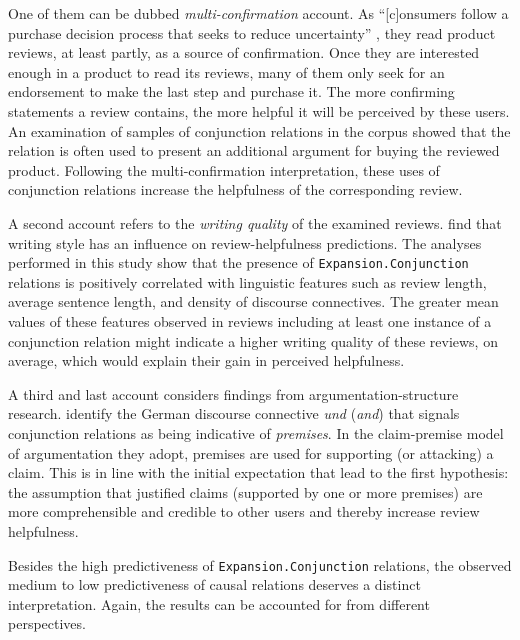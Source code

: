 \documentclass[
    a4paper,%
    12pt,%
    oneside,%
    toc=bibliography,
    final,
]{scrartcl}
\begin{document}
One of them can be dubbed \textit{multi-confirmation} account. As “[c]onsumers follow a purchase decision process that seeks to reduce uncertainty” \citep[187]{MudambiSchuff2010}, they read product reviews, at least partly, as a source of confirmation. Once they are interested enough in a product to read its reviews, many of them only seek for an endorsement to make the last step and purchase it. The more confirming statements a review contains, the more helpful it will be perceived by these users. An examination of samples of conjunction relations in the corpus showed that the relation is often used to present an additional argument for buying the reviewed product. Following the multi-confirmation interpretation, these uses of conjunction relations increase the helpfulness of the corresponding review.

A second account refers to the \textit{writing quality} of the examined reviews. \citet{Liu2008} find that writing style has an influence on review-helpfulness predictions. The analyses performed in this study show that the presence of \lstinline|Expansion.Conjunction| relations is positively correlated with linguistic features such as review length, average sentence length, and density of discourse connectives. The greater mean values of these features observed in reviews including at least one instance of a conjunction relation might indicate a higher writing quality of these reviews, on average, which would explain their gain in perceived helpfulness.

A third and last account considers findings from argumentation-structure research. \citet[2239]{Eckle-Kohler2015} identify the German discourse connective \textit{und} (\textit{and}) that signals conjunction relations as being indicative of \textit{premises}. In the claim-premise model of argumentation they adopt, premises are used for supporting (or attacking) a claim. This is in line with the initial expectation that lead to the first hypothesis: the assumption that justified claims (supported by one or more premises) are more comprehensible and credible to other users and thereby increase review helpfulness.


Besides the high predictiveness of \lstinline|Expansion.Conjunction| relations, the observed medium to low predictiveness of causal relations deserves a distinct interpretation. Again, the results can be accounted for from different perspectives.
\end{document}
